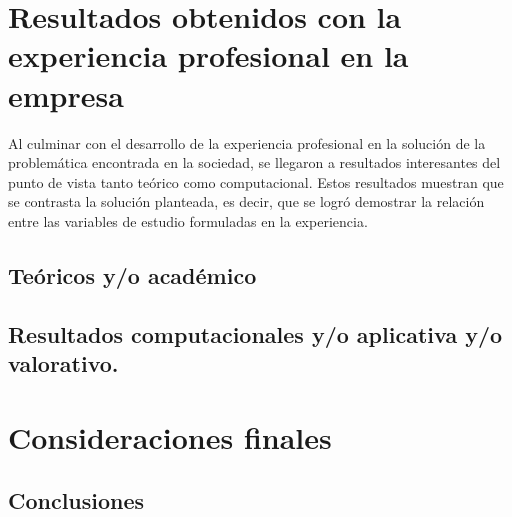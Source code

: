 \chapter{Resultados obtenidos con la experiencia profesional en la empresa}


Al culminar con el desarrollo de la experiencia profesional en la solución de la problemática encontrada en la sociedad, se llegaron a resultados interesantes del punto de vista tanto teórico como computacional. Estos resultados muestran que se contrasta la solución planteada, es decir, que se logró demostrar la relación entre las variables de estudio formuladas en la experiencia.

\section{Teóricos y/o académico}

\section{Resultados computacionales y/o aplicativa y/o valorativo.}




\chapter{Consideraciones finales}

\section{Conclusiones}

